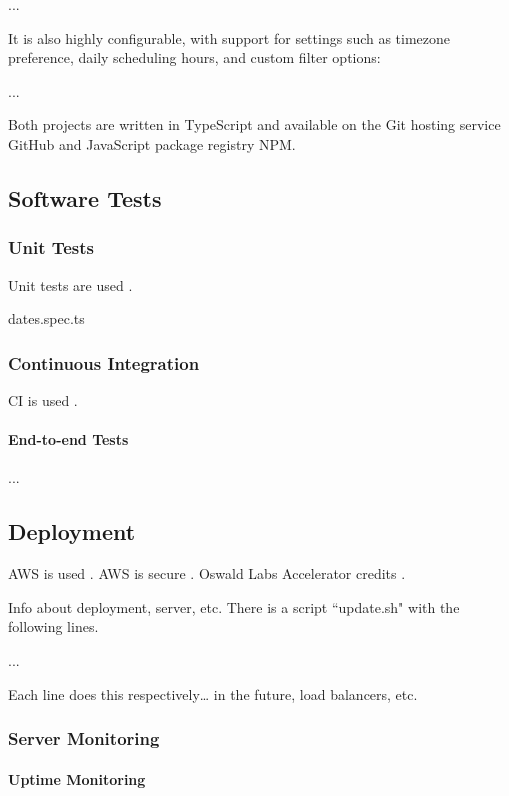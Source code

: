 \documentclass{article}
\begin{document}
...

It is also highly configurable, with support for settings such as timezone preference, daily scheduling hours, and custom filter options:

...

Both projects are written in TypeScript and available on the Git hosting service GitHub and JavaScript package registry NPM.

\subsection{Software Tests}

\subsubsection{Unit Tests}

Unit tests are used \cite{tosun_effectiveness_2018}.

dates.spec.ts

\subsubsection{Continuous Integration}

CI is used \cite{li_extensive_2020}.

\paragraph{End-to-end Tests} ...

\subsection{Deployment}

AWS is used \cite{shokeen_deploying_2019}. AWS is secure \cite{narula_cloud_2015}. Oswald Labs Accelerator credits \cite{noauthor_oswald_nodate}.

Info about deployment, server, etc. There is a script ``update.sh" with the following lines.

...


Each line does this respectively… in the future, load balancers, etc.

\subsubsection{Server Monitoring}

\paragraph{Uptime Monitoring}
\end{document}
